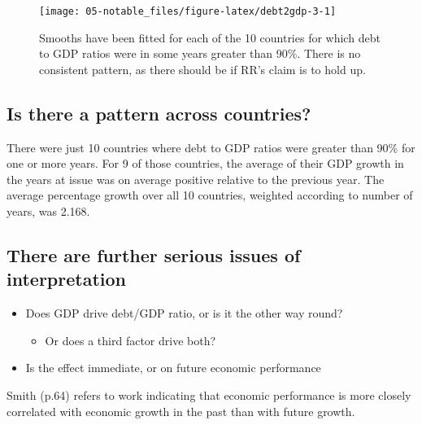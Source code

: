 \documentclass[
  10pt,
  b5paper]{book}
\providecommand{\tightlist}{%
  \setlength{\itemsep}{0pt}\setlength{\parskip}{0pt}}
\begin{document}
\begin{figure}[H]

{\centering \texttt{[image: 05-notable\_files/figure-latex/debt2gdp-3-1]} 

}

\caption{Smooths have been fitted for each of the 10 countries
for which debt to GDP ratios were in some years greater than 90\%.
There is no consistent pattern, as there should be if RR's claim
is to hold up.}\label{fig:debt2gdp-3}
\end{figure}

\hypertarget{is-there-a-pattern-across-countries}{%
\subsection*{Is there a pattern across countries?}\label{is-there-a-pattern-across-countries}}

There were just 10 countries where debt to GDP ratios were
greater than 90\% for one or more years. For 9 of
those countries, the average of their GDP growth in the years at issue
was on average positive relative to the previous year. The average
percentage growth over all 10 countries, weighted according
to number of years, was 2.168.

\hypertarget{there-are-further-serious-issues-of-interpretation}{%
\subsection*{There are further serious issues of interpretation}\label{there-are-further-serious-issues-of-interpretation}}

\begin{itemize}
\tightlist
\item
  Does GDP drive debt/GDP ratio, or is it the other way round?

  \begin{itemize}
  \tightlist
  \item
    Or does a third factor drive both?
  \end{itemize}
\item
  Is the effect immediate, or on future economic performance
\end{itemize}

Smith (p.64) refers to work indicating that economic performance
is more closely correlated with economic growth in the past than
with future growth.
\end{document}

